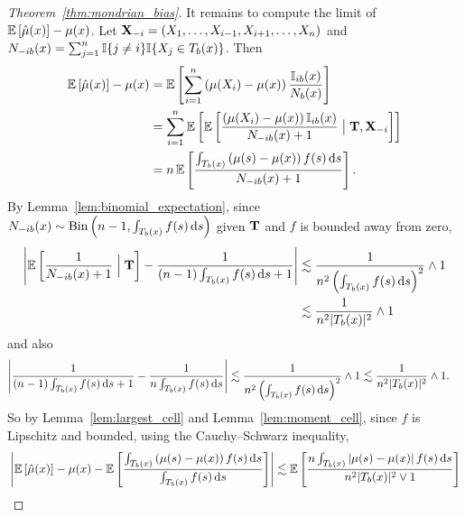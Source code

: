 \begin{proof}[Theorem~\ref{thm:mondrian_bias}]

  It remains to compute the limit of
  $\mathbb{E} \left[ \hat \mu(x) \right] - \mu(x)$.
  Let $\mathbf{X}_{-i} = (X_1, \ldots, X_{i-1}, X_{i+1}, \ldots, X_n)$
  and $N_{-i b}(x) = \sum_{j=1}^n \mathbb{I}\{j \neq i\} \mathbb{I}\{X_j \in T_b(x)\}$.
  Then
  \begin{align*}
    \mathbb{E} \left[ \hat \mu(x) \right]
    - \mu(x)
    &=
    \mathbb{E} \left[
      \sum_{i=1}^{n}
      \left( \mu(X_i) - \mu(x) \right)
      \frac{\mathbb{I}_{i b}(x)}{N_b(x)}
    \right] \\
    &=
    \sum_{i=1}^{n}
    \mathbb{E} \left[
      \mathbb{E} \left[
        \frac{\left( \mu(X_i) - \mu(x) \right)\mathbb{I}_{i b}(x)}
        {N_{-i b}(x) + 1}
        \bigm| \mathbf{T}, \mathbf{X}_{-i}
      \right]
    \right] \\
    &=
    n \,
    \mathbb{E} \left[
      \frac{\int_{T_b(x)} \left( \mu(s) - \mu(x) \right) f(s) \,\mathrm{d}s}
      {N_{-i b}(x) + 1}
    \right].
  \end{align*}
  By Lemma~\ref{lem:binomial_expectation}, since
  $N_{-i b}(x) \sim \operatorname{Bin}\left(n-1,
  \int_{T_b(x)} f(s) \,\mathrm{d}s \right)$
  given $\mathbf{T}$
  and $f$ is bounded away from zero,
  \begin{align*}
    \left|
    \mathbb{E} \left[
      \frac{1}{N_{-i b}(x) + 1}
      \Bigm| \mathbf{T}
    \right]
    - \frac{1}{(n-1) \int_{T_b(x)} f(s) \,\mathrm{d}s + 1}
    \right|
    &\lesssim
    \frac{1}{n^2 \left( \int_{T_b(x)} f(s) \,\mathrm{d}s \right)^2}
    \wedge 1 \\
    &\lesssim
    \frac{1}{n^2 |T_b(x)|^2}
    \wedge 1
  \end{align*}
  and also
  \begin{align*}
    \left|
    \frac{1}{(n-1) \int_{T_b(x)} f(s) \,\mathrm{d}s + 1}
    - \frac{1}{n \int_{T_b(x)} f(s) \,\mathrm{d}s}
    \right|
    &\lesssim
    \frac{1}{n^2 \left( \int_{T_b(x)} f(s) \,\mathrm{d}s\right)^2}
    \wedge 1
    \lesssim
    \frac{1}{n^2 |T_b(x)|^2}
    \wedge 1.
  \end{align*}
  So by Lemma~\ref{lem:largest_cell}
  and Lemma~\ref{lem:moment_cell},
  since $f$ is Lipschitz and bounded,
  using the Cauchy--Schwarz inequality,
  \begin{align*}
    &\left|
    \E \left[ \hat \mu(x) \right]
    - \mu(x)
    - \E \left[
      \frac{\int_{T_b(x)} \left( \mu(s) - \mu(x) \right) f(s) \diff s}
      {\int_{T_b(x)} f(s) \diff s}
    \right]
    \right|
    \lesssim
    \E \left[
      \frac{n \int_{T_b(x)} \left| \mu(s) - \mu(x) \right| f(s) \diff s}
      {n^2 |T_b(x)|^2 \vee 1}
    \right] \\

\end{align*}
\end{proof}
